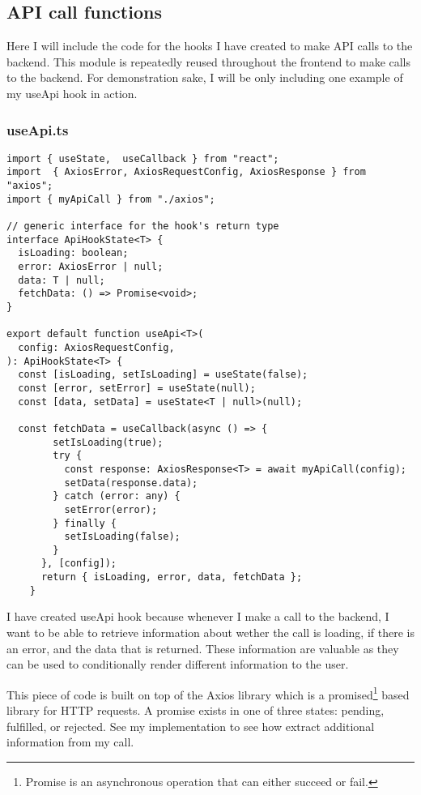 \subsection{API call functions}
Here I will include the code for the hooks I have created to make API calls to the backend. This module is repeatedly reused throughout the frontend to make calls to the backend. For demonstration sake, I will be only including one example of my useApi hook in action.

\subsubsection{useApi.ts}
\begin{verbatim}
import { useState,  useCallback } from "react";
import  { AxiosError, AxiosRequestConfig, AxiosResponse } from "axios";
import { myApiCall } from "./axios";

// generic interface for the hook's return type
interface ApiHookState<T> {
  isLoading: boolean;
  error: AxiosError | null; 
  data: T | null;
  fetchData: () => Promise<void>;
}

export default function useApi<T>(
  config: AxiosRequestConfig,
): ApiHookState<T> {
  const [isLoading, setIsLoading] = useState(false);
  const [error, setError] = useState(null);
  const [data, setData] = useState<T | null>(null);

  const fetchData = useCallback(async () => {
        setIsLoading(true);
        try {
          const response: AxiosResponse<T> = await myApiCall(config);
          setData(response.data);
        } catch (error: any) {
          setError(error);
        } finally {
          setIsLoading(false);
        }
      }, [config]);
      return { isLoading, error, data, fetchData };
    }
\end{verbatim}
I have created useApi hook because whenever I make a call to the backend, I want to be able to retrieve information about wether the call is loading, if there is an error, and the data that is returned. These information are valuable as they can be used to conditionally render different information to the user. 

This piece of code is built on top of the Axios library which is a promised\footnote{Promise is an asynchronous operation that can either succeed or fail. }  based library for HTTP requests. A promise exists in one of three states: pending, fulfilled, or rejected. See my implementation to see how extract additional information from my call.

